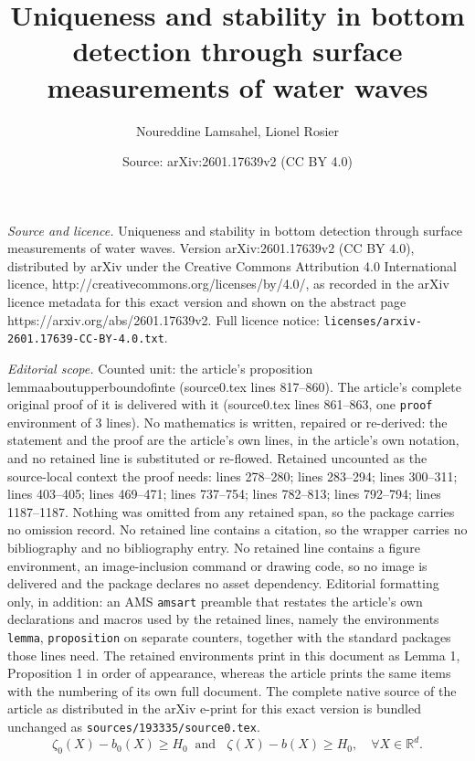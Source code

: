 \documentclass[10pt,a4paper]{amsart}
\title{Uniqueness and stability in bottom detection through surface measurements of water waves}
\author{Noureddine Lamsahel, Lionel Rosier}
\date{Source: arXiv:2601.17639v2 (CC BY 4.0)}
\begin{document}
\maketitle

\noindent\emph{Source and licence.} Uniqueness and stability in bottom detection through surface measurements of water waves. Version arXiv:2601.17639v2 (CC BY 4.0), distributed by arXiv under the Creative Commons Attribution 4.0 International licence, http://creativecommons.org/licenses/by/4.0/, as recorded in the arXiv licence metadata for this exact version and shown on the abstract page https://arxiv.org/abs/2601.17639v2. Full licence notice: \texttt{licenses/arxiv-2601.17639-CC-BY-4.0.txt}.\par\smallskip

\noindent\textit{Editorial scope.} Counted unit: the article's proposition lemmaaboutupperboundofinte (source0.tex lines 817--860). The article's complete original proof of it is delivered with it (source0.tex lines 861--863, one \texttt{proof} environment of 3 lines). No mathematics is written, repaired or re-derived: the statement and the proof are the article's own lines, in the article's own notation, and no retained line is substituted or re-flowed.  Retained uncounted as the source-local context the proof needs: lines 278--280; lines 283--294; lines 300--311; lines 403--405; lines 469--471; lines 737--754; lines 782--813; lines 792--794; lines 1187--1187.  Nothing was omitted from any retained span, so the package carries no omission record.  No retained line contains a citation, so the wrapper carries no bibliography and no bibliography entry.  No retained line contains a figure environment, an image-inclusion command or drawing code, so no image is delivered and the package declares no asset dependency.  Editorial formatting only, in addition: an AMS \texttt{amsart} preamble that restates the article's own declarations and macros used by the retained lines, namely the environments \texttt{lemma}, \texttt{proposition} on separate counters, together with the standard packages those lines need.  The retained environments print in this document as Lemma 1, Proposition 1 in order of appearance, whereas the article prints the same items with the numbering of its own full document.  The complete native source of the article as distributed in the arXiv e-print for this exact version is bundled unchanged as \texttt{sources/193335/source0.tex}.
\begin{equation}\label{conditionofliquid}
	\zeta_0(X)-b_0(X)\geq H_0\;\;\text{and }\;\; \zeta(X)-b(X)\geq H_0,\quad \forall X\in \mathbb{R} ^d. 
\end{equation}
\end{document}
